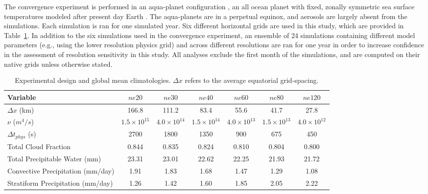 \documentclass[times]{qjrms4}
\begin{document}
The convergence experiment is performed in an aqua-planet configuration \citep{NH2000ASL,MWO2016JAMES}, an all ocean planet with fixed, zonally symmetric sea surface temperatures modeled after present day Earth \citep[$QOBS$ in][]{NH2000ASL}. The aqua-planets are in a perpetual equinox, and aerosols are largely absent from the simulations. Each simulation is ran for one simulated year. Six different horizontal grids are used in this study, which are provided in Table~\ref{tbl:table1}. In addition to the six simulations used in the convergence experiment, an ensemble of 24 simulations containing different model parameters (e.g., using the lower resolution physics grid) and across different resolutions are ran for one year in order to increase confidence in the assessment of resolution sensitivity in this study. All analyses exclude the first month of the simulations, and are computed on their native grids unless otherwise stated.

 \begin{table}
 \caption{Experimental design and global mean climatologies. $\Delta x$ refers to the average equatorial grid-spacing.}
 \centering
 \scriptsize
 \begin{tabular}{lcccccc}
   \hline
   Variable & $ne20$ & $ne30$ & $ne40$ & $ne60$ & $ne80$ & $ne120$ \\ 
   \hline
   $\Delta x$ (km) & 166.8 & 111.2 & 83.4 & 55.6 & 41.7 & 27.8 \\
   $\nu$ ($m^4/s$) & $1.5 \times 10^{15}$ & $4.0 \times 10^{14}$ & $1.5 \times 10^{14}$ & $4.0 \times 10^{13}$  & $1.5 \times 10^{13}$ & $4.0 \times 10^{12}$\\
    $\Delta t_{phys}$ (s) & 2700 & 1800 & 1350 & 900 & 675 & 450 \\
   Total Cloud Fraction & 0.844 & 0.835 & 0.824 & 0.810 & 0.804 & 0.800 \\ 
   Total Precipitable Water (mm) & 23.31& 23.01 & 22.62 & 22.25 & 21.93 & 21.72 \\
   Convective Precipitation (mm/day) & 1.91 & 1.83 & 1.68 & 1.47 & 1.29 & 1.08 \\
   Stratiform Precipitation (mm/day) & 1.26 & 1.42 & 1.60 & 1.85 & 2.05 & 2.22 \\      
 \hline
 \end{tabular}
 \label{tbl:table1}
 \end{table}
\end{document}
